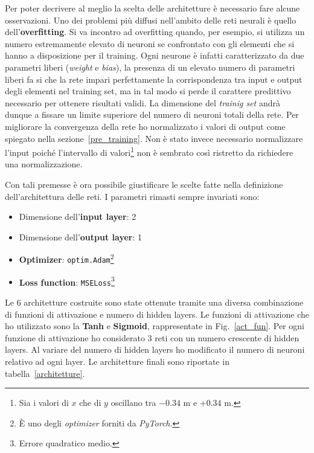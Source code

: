 \documentclass[12pt,a4paper,final]{book}
\begin{document}
Per poter decrivere al meglio la scelta delle architetture è necessario fare alcune osservazioni.
Uno dei problemi più diffusi nell'ambito delle reti neurali è quello dell'\textbf{overfitting}. Si va incontro ad overfitting quando, per esempio, si utilizza un numero estremamente elevato di neuroni se confrontato con gli elementi che si hanno a disposizione per il training.
Ogni neurone è infatti caratterizzato da due parametri liberi (\textit{weight} e \textit{bias}), la presenza di un elevato numero di parametri liberi fa si che la rete impari perfettamente la corrispondenza tra input e output degli elementi nel training set, ma in tal modo si perde il carattere predittivo necessario per ottenere risultati validi. La dimensione del \textit{trainig set} andrà dunque a fissare un limite superiore del numero di neuroni totali della rete.
Per migliorare la convergenza della rete ho normalizzato i valori di output come spiegato nella sezione~\ref{pre_training}.
Non è stato invece necessario normalizzare l'input poiché l'intervallo di valori\footnote{Sia i valori di $x$ che di $y$ oscillano tra $-0.34$ \unit{m} e $+0.34$ \unit{m}.} non è sembrato così ristretto da richiedere una normalizzazione.


Con tali premesse è ora possibile giustificare le scelte fatte nella definizione dell'architettura delle reti. I parametri rimasti sempre invariati sono:
\begin{itemize}
	\item Dimensione dell'\textbf{input layer}: 2
	\item Dimensione dell'\textbf{output layer}: 1
	\item \textbf{Optimizer}: \texttt{optim.Adam}\footnote{\`E uno degli \textit{optimizer} forniti da \textit{PyTorch}.}
	\item \textbf{Loss function}: \texttt{MSELoss}\footnote{Errore quadratico medio.}
\end{itemize}
Le 6 architetture costruite sono state ottenute tramite una diversa combinazione di funzioni di attivazione e numero di hidden layers. Le funzioni di attivazione che ho utilizzato sono la \textbf{Tanh} e \textbf{Sigmoid}, rappresentate in Fig.~\ref{act_fun}. Per ogni funzione di attivazione ho considerato 3 reti con un numero crescente di hidden layers. Al variare del numero di hidden layers ho modificato il numero di neuroni relativo ad ogni layer. Le architetture finali sono riportate in tabella~\ref{architetture}.
\end{document}
